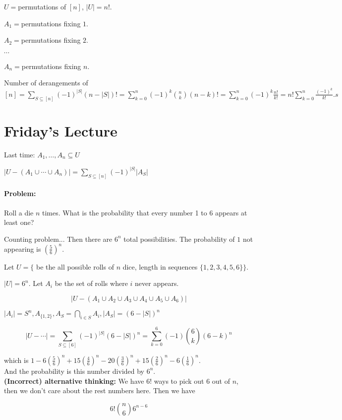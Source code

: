 \documentclass[a4paper, 11pt, twoside]{article}
\begin{document}
$U=$permutations of $[n]$, $|U|=n!$.

$A_1=$permutations fixing $1$.

$A_2=$permutations fixing $2$.

$\cdots$

$A_n=$permutations fixing $n$.

Number of derangements of $[n]=\sum_{S\subseteq [n]}(-1)^{|S|}(n-|S|)!=\sum^n_{k=0}(-1)^k{n\choose k}(n-k)!=\sum^n_{k=0}(-1)^k\frac{n!}{k!}=n!\sum^n_{k=0}\frac{(-1)^k}{k!}.s$

\section{Friday's Lecture}
Last time: $A_1,\dots, A_n\subseteq U$

$|U-(A_1\cup\cdots\cup A_n)|=\sum_{S\subseteq [n]}(-1)^{|S|}|A_S|$

\paragraph{Problem:} Roll a die $n$ times. What is the probability that every number 1 to 6 appears at least one?

Counting problem... Then there are $6^n$ total possibilities. The probability of $1$ not appearing is $\left(\frac{5}{6}\right)^n$.

Let $U=\{$ be the all possible rolls of $n$ dice, length in sequences $\{1,2,3,4,5,6\}\}$.

$|U|=6^n$. Let $A_i$ be the set of rolls where $i$ never appears.

\[|U-(A_1\cup A_2\cup A_3\cup A_4\cup A_5\cup A_6)|\]

$|A_i|=S^n, A_{\{1,2\}}, A_S=\bigcap_{i\in S}A_i, |A_S|=(6-|S|)^n$

\[|U-\cdots|=\sum_{S\subseteq [6]}(-1)^{|S|}(6-|S|)^n=\sum^6_{k=0}(-1){6\choose k}(6-k)^n\]

which is $1-6\left(\frac{5}{6}\right)^n+15\left(\frac{4}{6}\right)^n-20\left(\frac{3}{6}\right)^n+15\left(\frac{2}{6}\right)^n-6\left(\frac{1}{6}\right)^n$.\\

And the probability is this number divided by $6^n$.\\

\textbf{(Incorrect) alternative thinking:} We have $6!$ ways to pick out $6$ out of $n$, then we don't care about the rest numbers here. Then we have

\[6!{n \choose 6}6^{n-6}\]
\end{document}
